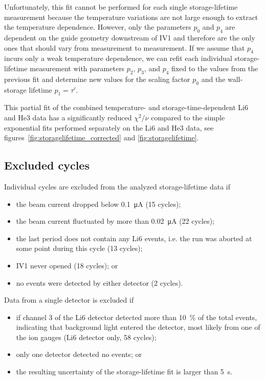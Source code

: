 \documentclass[10pt,letterpaper]{article}
\begin{document}
Unfortunately, this fit cannot be performed for each single storage-lifetime measurement because the temperature variations are not large enough to extract the temperature dependence. However, only the parameters $p_0$ and $p_4$ are dependent on the guide geometry downstream of IV1 and therefore are the only ones that should vary from measurement to measurement. If we assume that $p_4$ incurs only a weak temperature dependence, we can refit each individual storage-lifetime measurement with parameters $p_2$, $p_3$, and $p_4$ fixed to the values from the previous fit and determine new values for the scaling factor $p_0$ and the wall-storage lifetime $p_1 = \tau'$.

This partial fit of the combined temperature- and storage-time-dependent Li6 and He3 data has a significantly reduced $\chi^2/\nu$ compared to the simple exponential fits performed separately on the Li6 and He3 data, see figures~\ref{fig:storagelifetime_corrected} and \ref{fig:storagelifetime}.


\subsection{Excluded cycles}

Individual cycles are excluded from the analyzed storage-lifetime data if
\begin{itemize}
\item the beam current dropped below \SI{0.1}{\micro\ampere} (15 cycles);
\item the beam current fluctuated by more than \SI{0.02}{\micro\ampere} (22 cycles);
\item the last period does not contain any Li6 events, i.e. the run was aborted at some point during this cycle (13 cycles);
\item IV1 never opened (18 cycles); or
\item no events were detected by either detector (2 cycles).
\end{itemize}
Data from a single detector is excluded if
\begin{itemize}
\item if channel 3 of the Li6 detector detected more than \SI{10}{\percent} of the total events, indicating that background light entered the detector, most likely from one of the ion gauges (Li6 detector only, 58 cycles); 
\item only one detector detected no events; or
\item the resulting uncertainty of the storage-lifetime fit is larger than \SI{5}{\second}.
\end{itemize}
\end{document}
